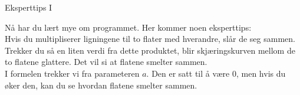 \documentclass[no]{./../../common/SurferDesc}%
\begin{document}
\footnotesize
%

\begin{surferPage}
  \begin{surferTitle}Eksperttips I\end{surferTitle}
  
   \begin{surferText}
Nå har du lært mye om programmet. Her kommer noen eksperttips:\\
\vspace{0.3cm}
Hvis du multipliserer ligningene til to flater med hverandre, slår de seg sammen. Trekker du så en liten verdi fra dette produktet, blir skjæringskurven mellom de to flatene glattere. Det vil si at flatene smelter sammen.\\
\vspace{0.3cm}
I formelen trekker vi fra parameteren $a$. Den er satt til å være $0$, men hvis du øker den, kan du se hvordan flatene smelter sammen. 
   \end{surferText}
\end{surferPage}

 
\end{document}
